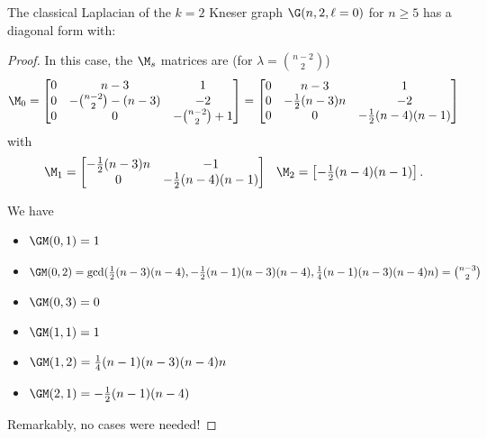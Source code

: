\begin{theorem}\label{t:k2k}
The classical Laplacian of the $k=2$ Kneser graph $\G(n, 2, \ell = 0)$ for $n \geq 5$ has a diagonal form with:
\begin{center}
\end{center}
\end{theorem}
\begin{proof}
In this case, the $\M_s$ matrices are (for $\lambda = \binom{n-2}{2}$)
\[ \M_0 = \begin{bmatrix} 0 & n-3 & 1 \\ 0 & -\binom{n-2}{2} - (n-3) & -2 \\ 0 & 0 & -\binom{n-2}{2} + 1 \end{bmatrix} 
= \begin{bmatrix} 0 & n-3 & 1 \\ 0 & -\frac{1}{2}(n-3)n & -2 \\ 0 & 0 & -\frac{1}{2}(n-4)(n-1) \end{bmatrix}  \]
with
\[ \M_1 = \begin{bmatrix} -\frac{1}{2}(n-3)n & -1 \\ 0 & -\frac{1}{2}(n-4)(n-1) \end{bmatrix}  
\hspace{0.1in}
\M_2 = \begin{bmatrix} -\frac{1}{2}(n-4)(n-1) \end{bmatrix}. \]

We have 
\begin{itemize} 
    \item $\GM(0,1) = 1$
    \item $\GM(0,2) = \gcd(\frac{1}{2}(n - 3)(n - 4), -\frac{1}{2}(n - 1)(n - 3)(n - 4), \frac{1}{4}(n - 1)(n - 3)(n - 4)n) = \binom{n-3}{2}$
    \item $\GM(0,3) = 0$
    \item $\GM(1,1) = 1$
    \item $\GM(1,2) = \frac{1}{4}(n - 1)(n - 3)(n - 4)n$
    \item $\GM(2,1) = -\frac{1}{2}(n - 1)(n - 4)$
\end{itemize}

Remarkably, no cases were needed!
\end{proof}


